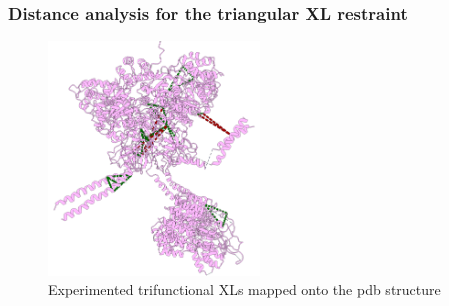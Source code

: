 \documentclass[a4paper,8pt]{beamer}
\begin{document}
%
\begin{frame}
  \frametitle{Distance analysis for the triangular XL restraint}
  \begin{figure}
    \centering
    \includegraphics[width=0.5\textwidth]{test-figures/exp-triples.png}
    \caption{Experimented trifunctional XLs mapped onto the pdb structure}
    \end{figure}

\end{frame}
%
\end{document}
